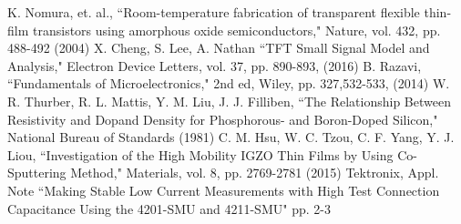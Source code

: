 \documentclass[conference]{IEEEtran}
\begin{document}
\begin{thebibliography}{00}
     K. Nomura, et. al., ``Room-temperature fabrication of transparent flexible thin-film transistors using amorphous oxide semiconductors," Nature, vol. 432, pp. 488-492 (2004)
     X. Cheng, S. Lee, A. Nathan ``TFT Small Signal Model and Analysis," Electron Device Letters, vol. 37, pp. 890-893, (2016)
     B. Razavi, ``Fundamentals of Microelectronics," 2nd ed, Wiley, pp. 327,532-533, (2014)
     W. R. Thurber, R. L. Mattis, Y. M. Liu, J. J. Filliben, ``The Relationship Between Resistivity and Dopand Density for Phosphorous- and Boron-Doped Silicon," National Bureau of Standards (1981)
     C. M. Hsu, W. C. Tzou, C. F. Yang, Y. J. Liou, ``Investigation of the High Mobility IGZO Thin Films by Using Co-Sputtering Method," Materials, vol. 8, pp. 2769-2781 (2015)
     Tektronix, Appl. Note ``Making Stable Low Current Measurements with High Test Connection Capacitance Using the 4201-SMU and 4211-SMU" pp. 2-3
\end{thebibliography}
\end{document}
